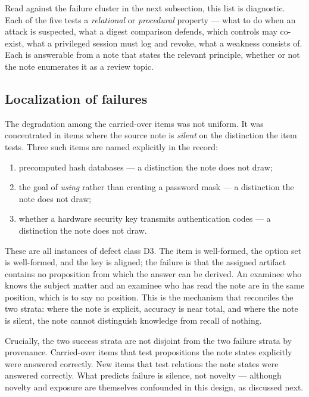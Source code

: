 \documentclass[11pt]{article}
\begin{document}
Read against the failure cluster in the next subsection, this list is
diagnostic. Each of the five tests a \emph{relational} or
\emph{procedural} property --- what to do when an attack is suspected, what a
digest comparison defends, which controls may co-exist, what a privileged
session must log and revoke, what a weakness consists of. Each is
answerable from a note that states the relevant principle, whether or not
the note enumerates it as a review topic.

\subsection{Localization of failures}
\label{sec:local}

The degradation among the carried-over items was not uniform. It was
concentrated in items where the source note is \emph{silent} on the
distinction the item tests. Three such items are named explicitly in the
record:

\begin{enumerate}[label=\textbf{S\arabic*.}]
\item precomputed hash databases --- a distinction the note does not draw;
\item the goal of \emph{using} rather than creating a password mask --- a
      distinction the note does not draw;
\item whether a hardware security key transmits authentication codes --- a
      distinction the note does not draw.
\end{enumerate}

These are all instances of defect class D3. The item is well-formed, the
option set is well-formed, and the key is aligned; the failure is that the
assigned artifact contains no proposition from which the answer can be
derived. An examinee who knows the subject matter and an examinee who has
read the note are in the same position, which is to say no position. This is
the mechanism that reconciles the two strata: where the note is explicit,
accuracy is near total, and where the note is silent, the note cannot
distinguish knowledge from recall of nothing.

Crucially, the two success strata are not disjoint from the two failure
strata by provenance. Carried-over items that test propositions the note
states explicitly were answered correctly. New items that test relations the
note states were answered correctly. What predicts failure is silence, not
novelty --- although novelty and exposure are themselves confounded in this
design, as discussed next.
\end{document}
